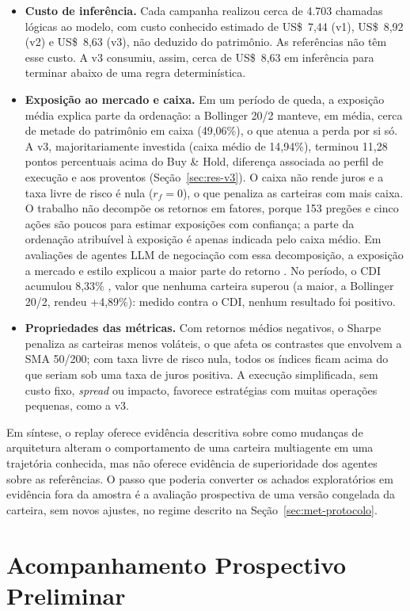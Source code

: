\begin{itemize}
    \item \textbf{Custo de inferência.} Cada campanha realizou cerca de 4.703 chamadas lógicas ao modelo, com custo conhecido estimado de US\$~7,44 (v1), US\$~8,92 (v2) e US\$~8,63 (v3), não deduzido do patrimônio. As referências não têm esse custo. A v3 consumiu, assim, cerca de US\$~8,63 em inferência para terminar abaixo de uma regra determinística.
    \item \textbf{Exposição ao mercado e caixa.} Em um período de queda, a exposição média explica parte da ordenação: a Bollinger 20/2 manteve, em média, cerca de metade do patrimônio em caixa (49,06\%), o que atenua a perda por si só. A v3, majoritariamente investida (caixa médio de 14,94\%), terminou 11,28 pontos percentuais acima do Buy \& Hold, diferença associada ao perfil de execução e aos proventos (Seção~\ref{sec:res-v3}). O caixa não rende juros e a taxa livre de risco é nula ($r_f = 0$), o que penaliza as carteiras com mais caixa. O trabalho não decompõe os retornos em fatores, porque 153 pregões e cinco ações são poucos para estimar exposições com confiança; a parte da ordenação atribuível à exposição é apenas indicada pelo caixa médio. Em avaliações de agentes LLM de negociação com essa decomposição, a exposição a mercado e estilo explicou a maior parte do retorno \citep{Wang2026beta}. No período, o CDI acumulou 8,33\% \citep{BCBCDI2026}, valor que nenhuma carteira superou (a maior, a Bollinger 20/2, rendeu +4,89\%): medido contra o CDI, nenhum resultado foi positivo.
    \item \textbf{Propriedades das métricas.} Com retornos médios negativos, o Sharpe penaliza as carteiras menos voláteis, o que afeta os contrastes que envolvem a SMA 50/200; com taxa livre de risco nula, todos os índices ficam acima do que seriam sob uma taxa de juros positiva. A execução simplificada, sem custo fixo, \textit{spread} ou impacto, favorece estratégias com muitas operações pequenas, como a v3.
\end{itemize}

Em síntese, o replay oferece evidência descritiva sobre como mudanças de arquitetura alteram o comportamento de uma carteira multiagente em uma trajetória conhecida, mas não oferece evidência de superioridade dos agentes sobre as referências. O passo que poderia converter os achados exploratórios em evidência fora da amostra é a avaliação prospectiva de uma versão congelada da carteira, sem novos ajustes, no regime descrito na Seção~\ref{sec:met-protocolo}.

\section{Acompanhamento Prospectivo Preliminar}
\label{sec:obs-operacional}


